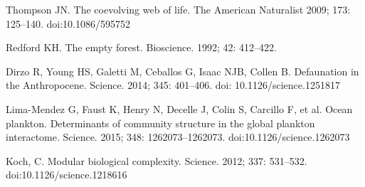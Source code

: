 \documentclass[10pt,letterpaper]{article}
\begin{document}
\nolinenumbers

\begin{thebibliography}{10}
Thompson JN. The coevolving web of life. The American Naturalist 2009; 173: 125–140. doi:10.1086/595752

Redford KH. The empty forest. Bioscience. 1992; 42: 412–422. 

Dirzo R, Young HS, Galetti M, Ceballos G, Isaac NJB, Collen B. Defaunation in the Anthropocene. Science. 2014; 345: 401–406. doi: 10.1126/science.1251817

Lima-Mendez G, Faust K, Henry N, Decelle J, Colin S, Carcillo F, et al. Ocean plankton. Determinants of community structure in the global plankton interactome. Science. 2015; 348: 1262073–1262073. doi:10.1126/science.1262073

Koch, C. Modular biological complexity. Science. 2012; 337: 531–532. doi:10.1126/science.1218616

\end{thebibliography}

\newpage
\end{document}
